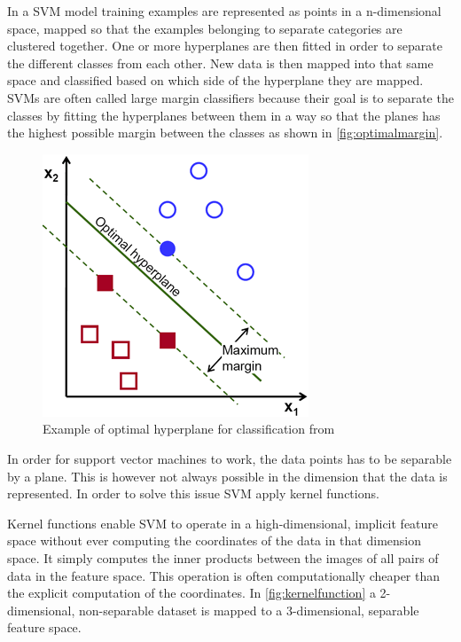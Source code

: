 In a SVM model training examples are represented as points in a n-dimensional space, mapped so that the examples belonging to separate categories are clustered together. One or more hyperplanes are then fitted in order to separate the different classes from each other. New data is then mapped into that same space and classified based on which side of the hyperplane they are mapped. SVMs are often called large margin classifiers because their goal is to separate the classes by fitting the hyperplanes between them in a way so that the planes has the highest possible margin between the classes as shown in \autoref{fig:optimalmargin}.

\begin{figure}[!h]
	\centering
	\includegraphics[scale=2.5]{fig/optimal-hyperplane.png}
	\caption{Example of optimal hyperplane for classification from \cite{Opencv2017}}
	\label{fig:optimalmargin}
\end{figure}

In order for support vector machines to work, the data points has to be separable by a plane. This is however not always possible in the dimension that the data is represented. In order to solve this issue SVM apply kernel functions.

Kernel functions enable SVM to operate in a high-dimensional, implicit feature space without ever computing the coordinates of the data in that dimension space. It simply computes the inner products between the images of all pairs of data in the feature space. This operation is often computationally cheaper than the explicit computation of the coordinates. In \autoref{fig:kernelfunction}  a 2-dimensional, non-separable dataset is mapped to a 3-dimensional, separable feature space.

